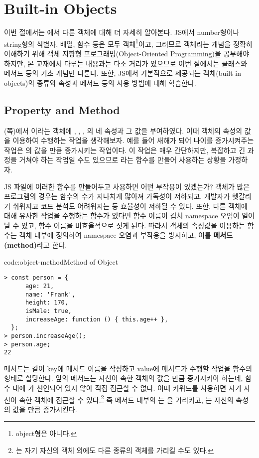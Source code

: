 \section{Built-in Objects}\label{sect:built-in-objects}

이번 절에서는 에서 다룬 객체에 대해 더 자세히 알아본다. JS에서 number형이나 string형의 식별자, 배열, 함수 등은 모두 객체\footnote{object형은 아니다.}이고, 그러므로 객체라는 개념을 정확히 이해하기 위해 객체 지향형 프로그래밍(Object-Oriented Programming)을 공부해야 하지만, 본 교재에서 다루는 내용과는 다소 거리가 있으므로 이번 절에서는 클래스와 메서드 등의 기초 개념만 다룬다. 또한, JS에서 기본적으로 제공되는 객체(built-in objects)의 종류와 속성과 메서드 등의 사용 방법에 대해 학습한다.

\subsection*{Property and Method}

(\pageref{code:object-type}쪽)에서 이라는 객체에 , , , 의 네 속성과 그 값을 부여하였다. 이때  객체의 속성의 값을 이용하여 수행하는 작업을 생각해보자. 예를 들어 새해가 되어 나이를 증가시켜주는 작업은 의 값을 만큼 증가시키는 작업이다. 이 작업은 매우 간단하지만, 복잡하고 긴 과정을 거쳐야 하는 작업일 수도 있으므로 라는 함수를 만들어 사용하는 상황을 가정하자.

JS 파일에 이러한 함수를 만들어두고 사용하면 어떤 부작용이 있겠는가? 객체가 많은 프로그램의 경우는 함수의 수가 지나치게 많아져 가독성이 저하되고, 개발자가 헷갈리기 쉬워지고 코드 분석도 어려워지는 등 효율성이 저하될 수 있다. 또한, 다른 객체에 대해 유사한 작업을 수행하는 함수가 있다면 함수 이름이 겹쳐 namespace 오염이 일어날 수 있고, 함수 이름을 비효율적으로 짓게 된다. 따라서 객체의 속성값을 이용하는 함수는 객체 내부에 정의하여 namespace 오염과 부작용을 방지하고, 이를 \textbf{메서드(method)}라고 한다.

\begin{codeenv}{code:object-method}{Method of Object}\begin{verbatim}
> const person = {
      age: 21,
      name: 'Frank',
      height: 170,
      isMale: true,
      increaseAge: function () { this.age++ },
  };
> person.increaseAge();
> person.age;
22
\end{verbatim}
\end{codeenv}

메서드는 \와 같이 key에 메서드 이름을 작성하고 value에 메서드가 수행할 작업을 함수의 형태로 할당한다. 앞의  메서드는 자신이 속한  객체의  값을 만큼 증가시켜야 하는데, 함수 내에 가 선언되어 있지 않아 직접 접근할 수 없다. 이때  키워드를 사용하면 자기 자신이 속한 객체에 접근할 수 있다.\footnote{는 자기 자신의 객체 외에도 다른 종류의 객체를 가리킬 수도 있다.} 즉  메서드 내부의 는 을 가리키고, 는 자신의 속성 의 값을 만큼 증가시킨다.

